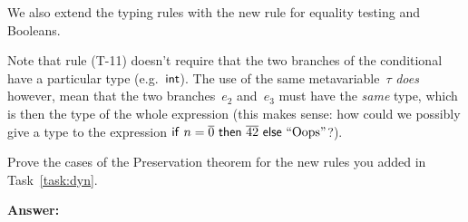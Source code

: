 \documentclass{article}
\begin{document}
We also extend the typing rules with the new rule for equality testing and
Booleans.

{
  \centering
  \def \MathparLineskip {\lineskip=0.43cm}
}

Note that rule (T-11) doesn't require that the two branches of the conditional
have a particular type (e.g.~$\mathsf{int}$).
%
The use of the same metavariable~$\tau$ {\em does} however, mean that the
two branches~$e_2$ and~$e_3$ must have the {\em same} type, which is then the
type of the whole expression
(this makes sense: how could we possibly give a type to the expression
$\mathsf{if}~n = \overline{0}~\mathsf{then}~\overline{42}~\mathsf{else}~\text{``}\text{Oops}\text{''}$?).

\begin{task}
  Prove the cases of the Preservation theorem for the new rules you
  added in Task~\ref{task:dyn}.
\end{task}

\textbf{Answer:}
\end{document}
